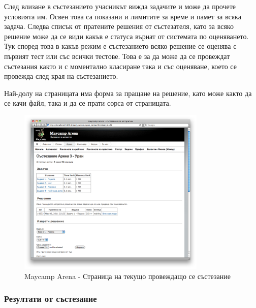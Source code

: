 \documentclass[a4paper,12pt]{article}
\begin{document}
  След влизане в състезанието учасникът вижда задачите и може да прочете условията им. Освен това са показани и лимитите за време и памет за всяка задача. Следва списък от пратените решения от състезателя, като за всяко решение може да се види какъв е статуса върнат от системата по оценяването. Тук според това в какъв режим е състезанието всяко решение се оценява с първият тест или със всички тестове. Това е за да може да се провеждат състезания както и с моментално класиране така и със оценяване, което се провежда след края на състезанието.
  
  Най-долу на страницата има форма за пращане на решение, като може както да се качи файл, така и да се прати сорса от страницата.

  \begin{figure}[ht]
    \begin{center}
      \includegraphics[width=0.8\textwidth]{maycamp_arena_contest.png}
    \end{center}
    \caption{Maycamp Arena - Страница на текущо провеждащо се състезание}
    \label{arena_contest_page}
  \end{figure}
  
  \pagebreak
  
  \subsubsection{Резултати от състезание}
\end{document}

